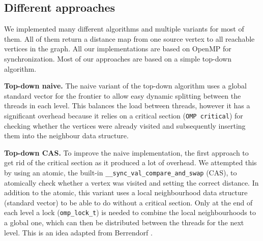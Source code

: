 \documentclass[letterpaper]{article}
\newcommand{\mypar}[1]{{\bf #1.}} %
\begin{document}
		\subsection{Different approaches}\label{sec:approaches}
		
		We implemented many different algorithms and multiple variants for most of them. 			All of them return a distance map from one source vertex to all reachable vertices in the graph.
		All our implementations are based on OpenMP for synchronization.
		Most of our approaches are based on a simple top-down algorithm. 

		\mypar{Top-down naive}
		The naive variant of the top-down algorithm uses a global standard vector for the frontier to allow easy dynamic splitting between the threads in each level. 
		This balances the load between threads, however it has a significant overhead because it relies on a critical section (\verb+OMP critical+) for checking whether the vertices were already visited and subsequently inserting them into the neighbour data structure.

		\mypar{Top-down CAS}
		To improve the naive implementation, the first approach to get rid of the critical section as it produced a lot of overhead. 
		We attempted this by using an atomic, the built-in \verb+__sync_val_compare_and_swap+ (CAS), to atomically check whether a vertex was visited and setting the correct distance. 
		In addition to the atomic, this variant uses a local neighbourhood data structure (standard vector) to be able to do without a critical section. 
		Only at the end of each level a lock (\verb+omp_lock_t+) is needed to combine the local neighbourhoods to a global one, which can then be distributed between the threads for the next level. 
		This is an idea adapted from Berrendorf \cite{Berrendorf:14}.
		
\end{document}

